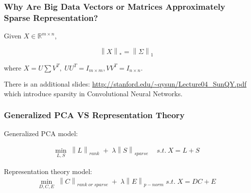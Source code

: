 \documentclass[aspectratio=2516]{beamer}
\begin{document}
\begin{frame}

\frametitle{\small Why Are Big Data Vectors or Matrices Approximately Sparse Representation? }

Given $ X \in \mathbb{R}^{m\times n} $, 

\begin{equation}
{\left\| X \right\|_*} = {\left\| \Sigma  \right\|_1}
\end{equation}

\vspace{0.5cm}

where $X = U\sum {V^T},\;U{U^T} = {I_{m \times m}},V{V^T} = {I_{n \times n}}$.

\vspace{1cm}

{\tiny  There is an additional slides: {\color{blue} \url{http://stanford.edu/~qysun/Lecture04_SunQY.pdf}} which introduce sparsity in Convolutional Neural Networks}.

\vspace{0.5cm}

\end{frame}

\begin{frame}

\frametitle{ Generalized PCA VS Representation Theory}

Generalized PCA model:

\begin{equation}
\begin{split}
\mathop {\min }\limits_{L,S} \;{\left\| L \right\|_{rank}}\; + \;\lambda{\left\| S \right\|_{sparse}} \quad \ s.t. \ X = L + S 
\end{split}
\end{equation}

\vspace{1cm}

Representation theory model:
\begin{equation}
\begin{split}
\mathop {\min }\limits_{D,C,E} \;{\left\| C \right\|_{rank\;or\;sparse}}\; + \;\lambda{\left\| E \right\|_{p - norm}}\;s.t.\;X = DC + E
\end{split}
\end{equation}


\end{frame}
\end{document}
